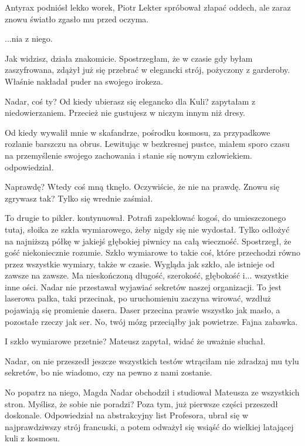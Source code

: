 \divider{}

Antyrax podniósł lekko worek, Piotr Lekter spróbował złapać oddech, ale zaraz znowu światło zgasło mu przed oczyma.

\divider{}

...nia z niego. \de{}

\ds{} Jak widzisz, działa znakomicie. \dm{} Spostrzegłam, że w czasie gdy byłam zaszyfrowana, zdążył już się przebrać w elegancki strój, pożyczony z garderoby. Właśnie nakładał puder na swojego irokeza. \de{}

\ds{} Nadar, coś ty? Od kiedy ubierasz się elegancko dla Kuli? \dm{} zapytałam z niedowierzaniem. \dm{} Przecież nie gustujesz w niczym innym niż dresy. \de{}

\ds{} Od kiedy wywalił mnie w skafandrze, pośrodku kosmosu, za przypadkowe rozlanie barszczu na obrus. 
Lewitując w bezkresnej pustce, miałem sporo czasu na przemyślenie swojego zachowania i stanie się nowym człowiekiem. \dm{} odpowiedział. \de{}

\ds{} Naprawdę? \dm{} Wtedy coś mną tknęło. \dm{} Oczywiście, że nie na prawdę. Znowu się zgrywasz tak? \dm{} Tylko się wrednie zaśmiał. \de{}

\ds{} To drugie to pikler. \dm{} kontynuował. \dm{} Potrafi zapeklować kogoś, do umieszczonego tutaj, słoika ze szkła wymiarowego, żeby nigdy się nie wydostał.
Tylko odłożyć na najniższą półkę w jakiejś głębokiej piwnicy na całą wieczność.
\dm{} Spostrzegł, że gość niekoniecznie rozumie. \dm{}
Szkło wymiarowe to takie coś, które przechodzi równo przez wszystkie wymiary, także w czasie. Wygląda jak szkło, ale istnieje od zawsze na zawsze. Ma nieskończoną długość, szerokość,
głębokość i... wszystkie inne ości. \dm{}
Nadar nie przestawał wyjawiać sekretów naszej organizacji. \dm{}
To jest laserowa pałka, taki przecinak, po uruchomieniu zaczyna wirować, wzdłuż pojawiają się promienie dasera. Daser przecina prawie wszystko jak masło,
a pozostałe rzeczy jak ser. No, twój mózg przeciąłby jak powietrze.
Fajna zabawka. \de{}

\ds{} I szkło wymiarowe przetnie? \ds{} Mateusz zapytał, widać że uważnie słuchał. \de{}

\ds{} Nadar, on nie przeszedł jeszcze wszystkich testów \dm{} wtrąciłam \dm{} nie zdradzaj mu tylu sekretów, bo nie wiadomo, czy na pewno z nami zostanie.

\ds{} No popatrz na niego, Magda \dm{} Nadar obchodził i studiował Mateusza ze wszystkich stron. \dm{} Myślisz, że sobie nie poradzi?
Poza tym, już pierwsze części przeszedł doskonale. Odpowiedział na abstrakcyjny list Profesora, ubrał się w najprawdziwszy strój francuski, a potem 
odważył się wsiąść do wielkiej latającej kuli z kosmosu. \de{}

